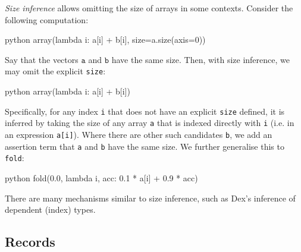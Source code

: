 \textit{Size inference} allows omitting the size of arrays in some contexts. Consider the following computation:
\begin{center} 
\begin{cminted}{python}
array(lambda i: a[i] + b[i], size=a.size(axis=0))
\end{cminted} 
\end{center}
Say that the vectors $\texttt{a}$ and $\texttt{b}$ have the same size. Then, with size inference, we may omit the explicit \texttt{size}:
\begin{center} 
\begin{cminted}{python}
array(lambda i: a[i] + b[i])
\end{cminted} 
\end{center}
Specifically, for any index \texttt{i} that does not have an explicit \texttt{size} defined, it is inferred by taking the size of any array \texttt{a} that is indexed directly with \texttt{i} (i.e. in an expression \texttt{a[i]}). 
Where there are other such candidates \texttt{b}, we add an assertion term that \texttt{a} and \texttt{b} have the same size. We further generalise this to \texttt{fold}:
\begin{center}
\begin{cminted}{python}
fold(0.0, lambda i, acc: 0.1 * a[i] + 0.9 * acc)
\end{cminted}
\end{center}
There are many mechanisms similar to size inference, such as Dex's inference of dependent (index) types.


\subsection{Records}

